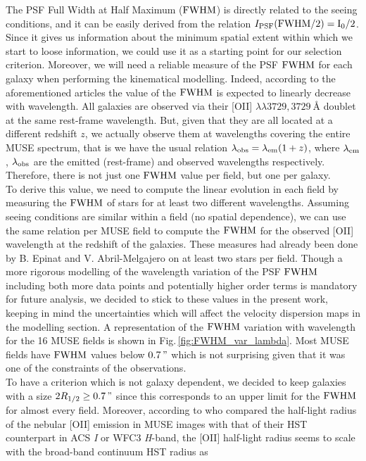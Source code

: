 The PSF Full Width at Half Maximum ($\rm{FWHM}$) is directly related to the seeing conditions, and it can be easily derived from the relation $I_{\rm{PSF}} ( \rm{FWHM}/2) = I_0 /2$. Since it gives us information about the minimum spatial extent within which we start to loose information, we could use it as a starting point for our selection criterion. Moreover, we will need a reliable measure of the PSF $\rm{FWHM}$ for each galaxy when performing the kinematical modelling. Indeed, according to the aforementioned articles the value of the $\rm{FWHM}$ is expected to linearly decrease with wavelength. All galaxies are observed via their [OII] $\lambda\lambda 3729, \SI{3729}{\angstrom}$ doublet at the same rest-frame wavelength. But, given that they are all located at a different redshift $z$, we actually observe them at wavelengths covering the entire MUSE spectrum, that is we have the usual relation $\lambda_{\rm{obs}} = \lambda_{\rm{em}} ( 1 + z )$, where $\lambda_{\rm{em}}$, $\lambda_{\rm{obs}}$ are the emitted (rest-frame) and observed wavelengths respectively. Therefore, there is not just one $\rm{FWHM}$ value per field, but one per galaxy. \\

To derive this value, we need to compute the linear evolution in each field by measuring the $\rm{FWHM}$ of stars for at least two different wavelengths. Assuming seeing conditions are similar within a field (no spatial dependence), we can use the same relation per MUSE field to compute the $\rm{FWHM}$ for the observed [OII] wavelength at the redshift of the galaxies. These measures had already been done by B. Epinat and V. Abril-Melgajero on at least two stars per field. Though a more rigorous modelling of the wavelength variation of the PSF $\rm{FWHM}$ including both more data points and potentially higher order terms is mandatory for future analysis, we decided to stick to these values in the present work, keeping in mind the uncertainties which will affect the velocity dispersion maps in the modelling section. A representation of the $\rm{FWHM}$ variation with wavelength for the 16 MUSE fields is shown in Fig.\,\ref{fig:FWHM_var_lambda}. Most MUSE fields have $\rm{FWHM}$ values below $\SI{0.7}{"}$ which is not surprising given that it was one of the constraints of the observations.\\

To have a criterion which is not galaxy dependent, we decided to keep galaxies with a size $2 R_{1/2} \geq \SI{0.7}{"}$ since this corresponds to an upper limit for the $\rm{FWHM}$ for almost every field. Moreover, according to  who compared the half-light radius of the nebular [OII] emission in MUSE images with that of their HST counterpart in ACS \textit{I} or WFC3 \textit{H}-band, the [OII] half-light radius seems to scale with the broad-band continuum HST radius as 

